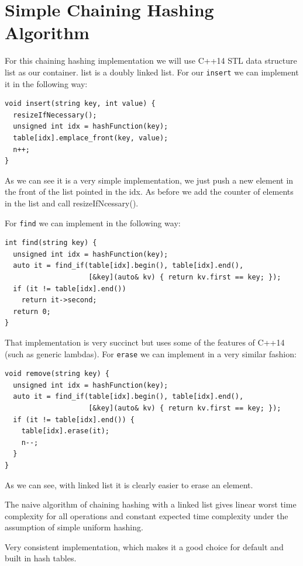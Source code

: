 \section{Simple Chaining Hashing Algorithm}

For this chaining hashing implementation we will use C++14 STL data structure list as our container. list is a doubly linked list. For our \texttt{insert} we can implement it in the following way:

\begin{lstlisting}
void insert(string key, int value) {
  resizeIfNecessary();
  unsigned int idx = hashFunction(key);      
  table[idx].emplace_front(key, value);
  n++;
}
\end{lstlisting}

As we can see it is a very simple implementation, we just push a new element in the front of the list pointed in the idx. As before we add the counter of elements in the list and call resizeIfNcessary().

For \texttt{find} we can implement in the following way:

\newpage

\begin{lstlisting}
int find(string key) {
  unsigned int idx = hashFunction(key);
  auto it = find_if(table[idx].begin(), table[idx].end(),
                    [&key](auto& kv) { return kv.first == key; });
  if (it != table[idx].end())
    return it->second;
  return 0;
}
\end{lstlisting}

That implementation is very succinct but uses some of the features of C++14 (such as generic lambdas). For \texttt{erase} we can implement in a very similar fashion:

\begin{lstlisting}
void remove(string key) {
  unsigned int idx = hashFunction(key);
  auto it = find_if(table[idx].begin(), table[idx].end(),
                    [&key](auto& kv) { return kv.first == key; });
  if (it != table[idx].end()) {
    table[idx].erase(it);
    n--;
  }
}
\end{lstlisting}

As we can see, with linked list it is clearly easier to erase an element. 

The naive algorithm of chaining hashing with a linked list gives linear worst time complexity for all operations and constant expected time complexity under the assumption of simple uniform hashing. 

\rightthumbsup Very consistent implementation, which makes it a good choice for default and built in hash tables.

